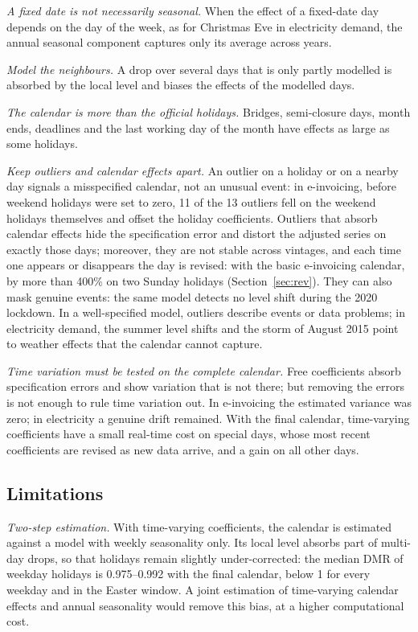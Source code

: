 \documentclass[Afour, times]{sagej}
\begin{document}
\textit{A fixed date is not necessarily seasonal.} When the effect of a fixed-date day depends on the day of the week, as for Christmas Eve in electricity demand, the annual seasonal component captures only its average across years.

\textit{Model the neighbours.} A drop over several days that is only partly modelled is absorbed by the local level and biases the effects of the modelled days.

\textit{The calendar is more than the official holidays.} Bridges, semi-closure days, month ends, deadlines and the last working day of the month have effects as large as some holidays.

\textit{Keep outliers and calendar effects apart.} An outlier on a holiday or on a nearby day signals a misspecified calendar, not an unusual event: in e-invoicing, before weekend holidays were set to zero, 11 of the 13 outliers fell on the weekend holidays themselves and offset the holiday coefficients. Outliers that absorb calendar effects hide the specification error and distort the adjusted series on exactly those days; moreover, they are not stable across vintages, and each time one appears or disappears the day is revised: with the basic e-invoicing calendar, by more than 400\% on two Sunday holidays (Section~\ref{sec:rev}). They can also mask genuine events: the same model detects no level shift during the 2020 lockdown. In a well-specified model, outliers describe events or data problems; in electricity demand, the summer level shifts and the storm of August 2015 point to weather effects that the calendar cannot capture.

\textit{Time variation must be tested on the complete calendar.} Free coefficients absorb specification errors and show variation that is not there; but removing the errors is not enough to rule time variation out. In e-invoicing the estimated variance was zero; in electricity a genuine drift remained. With the final calendar, time-varying coefficients have a small real-time cost on special days, whose most recent coefficients are revised as new data arrive, and a gain on all other days.

\subsection{Limitations}

\textit{Two-step estimation.} With time-varying coefficients, the calendar is estimated against a model with weekly seasonality only. Its local level absorbs part of multi-day drops, so that holidays remain slightly under-corrected: the median DMR of weekday holidays is 0.975--0.992 with the final calendar, below 1 for every weekday and in the Easter window. A joint estimation of time-varying calendar effects and annual seasonality would remove this bias, at a higher computational cost.
\end{document}
